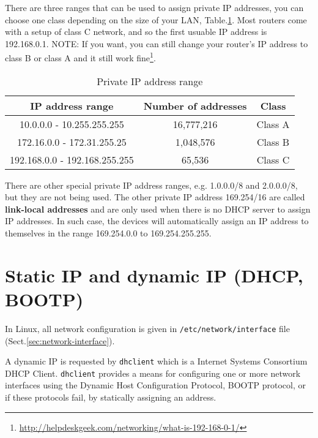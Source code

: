 There are three ranges that can be used to assign private IP addresses, you can
choose one class depending on the size of your LAN, Table.\ref{tab:private_IP}.
Most routers come with a setup of class C network, and so the first usuable IP
address is 192.168.0.1. NOTE: If you want, you can still change your router's IP
address to class B or class A and it still work
fine\footnote{\url{http://helpdeskgeek.com/networking/what-is-192-168-0-1/}}.

\begin{table}[hbt]
\begin{center}
\caption{Private IP address range}
\begin{tabular}{ccc} 
  \hline
IP address range & Number of addresses & Class \\ 
  \hline\hline
10.0.0.0 - 10.255.255.255	& 16,777,216 & Class A \\
172.16.0.0 - 172.31.255.25 &  1,048,576 & Class B \\
192.168.0.0 - 192.168.255.255 & 65,536 & Class C \\
\end{tabular}
\end{center}
\label{tab:private_IP}
\end{table}

\begin{framed}
There are other special private IP address ranges, e.g. 
1.0.0.0/8 and 2.0.0.0/8, but they are not being used. The other private IP
address 169.254/16 are called {\bf link-local addresses}
and are only used when there is no DHCP server to assign IP addresses. In such
case, the devices will automatically assign an IP address to themselves in the
range 169.254.0.0 to 169.254.255.255.
\end{framed}



\section{Static IP and dynamic IP (DHCP, BOOTP)}
\label{sec:static-IP}

In Linux, all network configuration is given in \verb!/etc/network/interface!
file (Sect.\ref{sec:network-interface}).

A dynamic IP is requested by \verb!dhclient! which is a Internet Systems
Consortium DHCP Client. \verb!dhclient! provides a means for configuring one or
more network interfaces using the Dynamic Host Configuration Protocol, BOOTP
protocol, or if these protocols fail, by statically assigning an address. 

